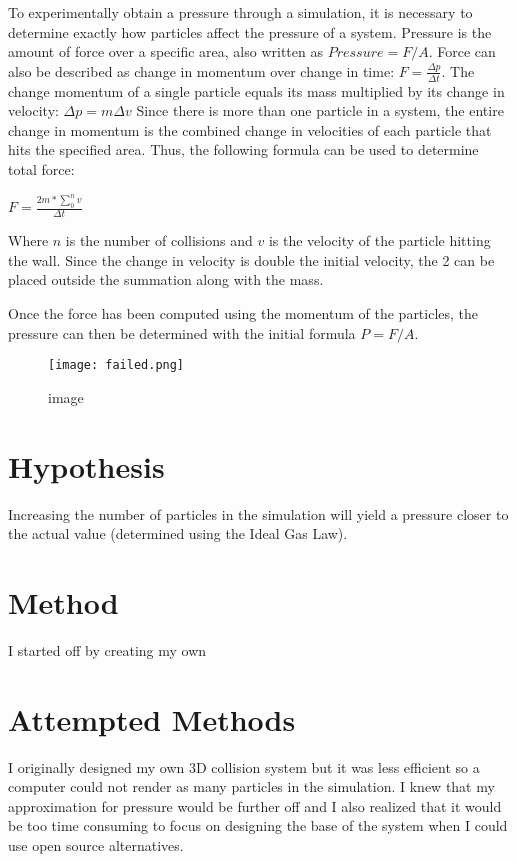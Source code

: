 \documentclass[]{article}
\makeatletter
\def\maxwidth{\ifdim\Gin@nat@width>\linewidth\linewidth
\else\Gin@nat@width\fi}
\let\Oldincludegraphics\includegraphics
\renewcommand{\includegraphics}[1]{\Oldincludegraphics[width=\maxwidth]{#1}}
\makeatother
\begin{document}
To experimentally obtain a pressure through a simulation, it is
necessary to determine exactly how particles affect the pressure of a
system. Pressure is the amount of force over a specific area, also
written as $Pressure=F/A$. Force can also be described as change in
momentum over change in time: $F = \frac{\Delta p}{\Delta t}$. The
change momentum of a single particle equals its mass multiplied by its
change in velocity: ${\Delta p} = m\Delta v$ Since there is more than
one particle in a system, the entire change in momentum is the combined
change in velocities of each particle that hits the specified area.
Thus, the following formula can be used to determine total force:

$F = \frac{2m * \displaystyle\sum\limits_{0}^n v}{\Delta t}$

Where $n$ is the number of collisions and $v$ is the velocity of the
particle hitting the wall. Since the change in velocity is double the
initial velocity, the 2 can be placed outside the summation along with
the mass.

Once the force has been computed using the momentum of the particles,
the pressure can then be determined with the initial formula $P = F/A$.

\begin{figure}[htbp]
\centering
\texttt{[image: failed.png]}
\caption{image}
\end{figure}

\section{Hypothesis}

Increasing the number of particles in the simulation will yield a
pressure closer to the actual value (determined using the Ideal Gas
Law).

\section{Method}

I started off by creating my own

\section{Attempted Methods}

I originally designed my own 3D collision system but it was less
efficient so a computer could not render as many particles in the
simulation. I knew that my approximation for pressure would be further
off and I also realized that it would be too time consuming to focus on
designing the base of the system when I could use open source
alternatives.
\end{document}
